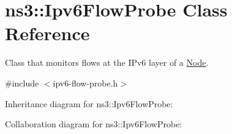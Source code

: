 \hypertarget{classns3_1_1Ipv6FlowProbe}{}\section{ns3\+:\+:Ipv6\+Flow\+Probe Class Reference}
\label{classns3_1_1Ipv6FlowProbe}


Class that monitors flows at the I\+Pv6 layer of a \hyperlink{classns3_1_1Node}{Node}.  




{\ttfamily \#include $<$ipv6-\/flow-\/probe.\+h$>$}



Inheritance diagram for ns3\+:\+:Ipv6\+Flow\+Probe\+:


Collaboration diagram for ns3\+:\+:Ipv6\+Flow\+Probe\+:
